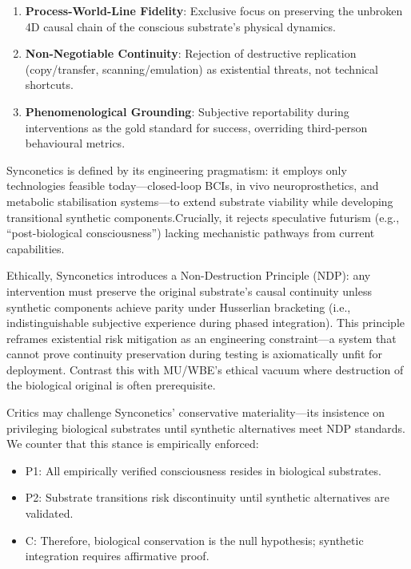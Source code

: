 \documentclass[10pt]{article}
\begin{document}
\begin{sloppypar}
  \begin{enumerate}
    \item \textbf{Process-World-Line Fidelity}: Exclusive focus on preserving the unbroken 4D causal chain of the conscious substrate’s physical dynamics.
    \item \textbf{Non-Negotiable Continuity}: Rejection of destructive replication (copy/transfer, scanning/emulation) as existential threats, not technical shortcuts.
    \item \textbf{Phenomenological Grounding}: Subjective reportability during interventions as the gold standard for success, overriding third-person behavioural metrics.
  \end{enumerate}

  Synconetics is defined by its engineering pragmatism: it employs only technologies feasible today—closed-loop BCIs, in vivo neuroprosthetics, and metabolic stabilisation systems—to extend substrate viability while developing transitional synthetic components.Crucially, it rejects speculative futurism (e.g., “post-biological consciousness”) lacking mechanistic pathways from current capabilities.

  Ethically, Synconetics introduces a Non-Destruction Principle (NDP): any intervention must preserve the original substrate’s causal continuity unless synthetic components achieve parity under Husserlian bracketing (i.e., indistinguishable subjective experience during phased integration). This principle reframes existential risk mitigation as an engineering constraint—a system that cannot prove continuity preservation during testing is axiomatically unfit for deployment. Contrast this with MU/WBE’s ethical vacuum where destruction of the biological original is often prerequisite.

  Critics may challenge Synconetics’ conservative materiality—its insistence on privileging biological substrates until synthetic alternatives meet NDP standards. We counter that this stance is empirically enforced:


  \begin{itemize}
    \item P1: All empirically verified consciousness resides in biological substrates.
    \item P2: Substrate transitions risk discontinuity until synthetic alternatives are validated.
    \item C: Therefore, biological conservation is the null hypothesis; synthetic integration requires affirmative proof.
  \end{itemize}


\end{sloppypar}
\end{document}
